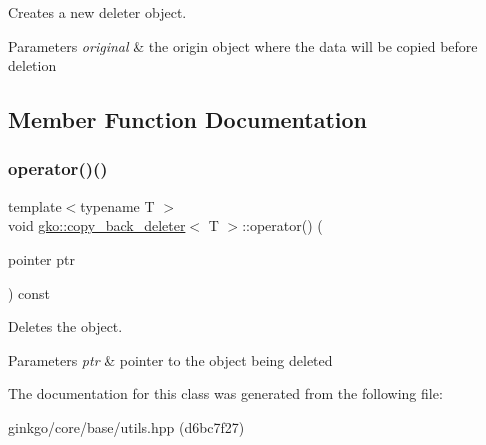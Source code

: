 Creates a new deleter object. 


\begin{DoxyParams}{Parameters}
{\em original} & the origin object where the data will be copied before deletion \\
\hline
\end{DoxyParams}


\subsection{Member Function Documentation}
\mbox{\label{classgko_1_1copy__back__deleter_a34bba76c78c23dccd814969e98c78b1b}} 
\subsubsection{\texorpdfstring{operator()()}{operator()()}}
{\footnotesize\ttfamily template$<$typename T $>$ \\
void \hyperlink{classgko_1_1copy__back__deleter}{gko\+::copy\+\_\+back\+\_\+deleter}$<$ T $>$\+::operator() (\begin{DoxyParamCaption}\item[{pointer}]{ptr }\end{DoxyParamCaption}) const\hspace{0.3cm}{\ttfamily [inline]}}



Deletes the object. 


\begin{DoxyParams}{Parameters}
{\em ptr} & pointer to the object being deleted \\
\hline
\end{DoxyParams}


The documentation for this class was generated from the following file\+:\begin{DoxyCompactItemize}
\item 
ginkgo/core/base/utils.\+hpp (d6bc7f27)\end{DoxyCompactItemize}
